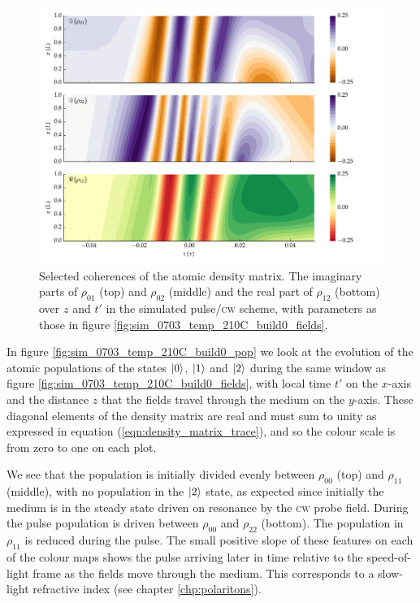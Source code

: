     \begin{figure}%
      \includegraphics[width=\linewidth]
        {figs/06_simultons/mb_vee2g_build0_15c_130p_0330t_230C_sb50_120vel000_00_002um_fig4.pdf}
      \caption{
      Selected coherences of the atomic density matrix. The imaginary parts of
      $\rho_{01}$ (top) and $\rho_{02}$ (middle) and the real part of
      $\rho_{12}$ (bottom) over $z$ and $t'$ in the simulated pulse/\textsc{cw}
      scheme, with parameters as those in figure
      \ref{fig:sim_0703_temp_210C_build0_fields}.
      }
      \label{fig:sim_0703_temp_210C_build0_coh}
    \end{figure}

    In figure \ref{fig:sim_0703_temp_210C_build0_pop} we look at the evolution
    of the atomic populations of the states $\Ket{0}$, $\Ket{1}$ and $\Ket{2}$
    during the same window as figure \ref{fig:sim_0703_temp_210C_build0_fields},
    with local time $t'$ on the $x$-axis and the distance $z$ that the fields
    travel through the medium on the $y$-axis. These diagonal elements of the
    density matrix are real and must sum to unity as expressed in equation
    (\ref{eqn:density_matrix_trace}), and so the colour scale is from zero to
    one on each plot.

    We see that the population is initially divided evenly between $\rho_{00}$
    (top) and $\rho_{11}$ (middle), with no population in the $\Ket{2}$ state,
    as expected since initially the medium is in the steady state driven on
    resonance by the \textsc{cw} probe field. During the pulse population is
    driven between $\rho_{00}$ and $\rho_{22}$ (bottom). The population in
    $\rho_{11}$ is reduced during the pulse. The small positive slope of these
    features on each of the colour maps shows the pulse arriving later in time
    relative to the  speed-of-light frame as the fields move through the medium.
    This corresponds to a slow-light refractive index (see chapter
    \ref{chp:polaritons}).

